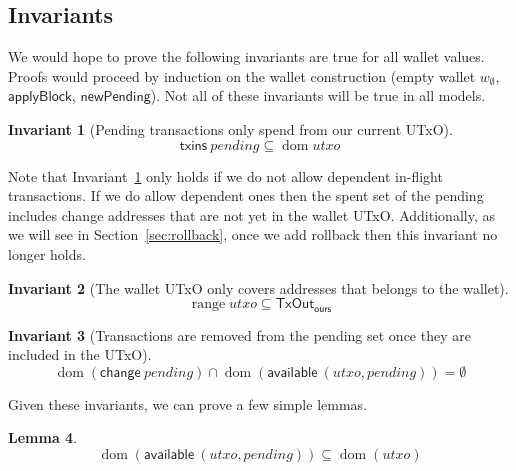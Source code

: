 \documentclass{article}
\DeclareMathOperator{\dom}{dom}
\DeclareMathOperator{\range}{range}
\newtheorem{lemma}{Lemma}[section] %
\newtheorem{invariant}[lemma]{Invariant}
\numberwithin{equation}{lemma}
\begin{document}
\subsection{Invariants}
\label{sec:invariants}

We would hope to prove the following invariants are true for all wallet values.
Proofs would proceed by induction on the wallet construction (empty wallet
$w_\emptyset$, $\mathsf{applyBlock}$, $\mathsf{newPending}$). Not
all of these invariants will be true in all models.

\begin{invariant}[Pending transactions only spend from our current UTxO]
\begin{equation*}
\mathsf{txins} ~ pending \subseteq \dom utxo
\end{equation*}
\label{inv:txins_in_dom_utxo}
\end{invariant}

Note that Invariant~\ref{inv:txins_in_dom_utxo} only holds if we do not allow
dependent in-flight transactions. If we do allow dependent ones then the spent
set of the pending includes change addresses that are not yet in the wallet
UTxO. Additionally, as we will see in Section~\ref{sec:rollback}, once we add
rollback then this invariant no longer holds.

\begin{invariant}[The wallet UTxO only covers addresses that belongs to the wallet]
%
\begin{equation*}
\range utxo \subseteq \mathsf{TxOut_{ours}}
\end{equation*}
\label{inv:utxo_is_ours}
\end{invariant}

\begin{invariant}[Transactions are removed from the pending set once they are included in the UTxO]
\begin{equation*}
\dom (\mathsf{change} ~ \mathit{pending}) \cap \dom (\mathsf{available} ~ (\mathit{utxo}, \mathit{pending})) = \emptyset
\end{equation*}
\label{inv:change_vs_available}
\end{invariant}

Given these invariants, we can prove a few simple lemmas.

\begin{lemma}
\begin{equation*}
\dom(\mathsf{available} ~ (\mathit{utxo}, \mathit{pending}))
\subseteq \dom(\mathit{utxo})
\end{equation*}
\label{lem:dom_available}
\end{lemma}
\end{document}
